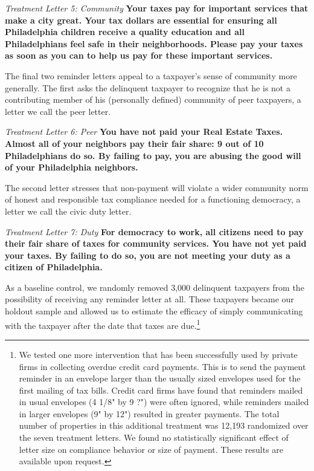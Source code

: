 \documentclass[12pt]{article}
\begin{document}
{\it Treatment Letter 5: Community} {\bf Your taxes pay for important services that make a city
  great. Your tax dollars are essential for ensuring all Philadelphia
  children receive a quality education and all Philadelphians feel
  safe in their neighborhoods. Please pay your taxes as soon as you
  can to help us pay for these important services.}

The final two reminder letters appeal to a taxpayer's sense of
community more generally.  The first asks the delinquent taxpayer to
recognize that he is not a contributing member of his (personally
defined) community of peer taxpayers, a letter we call the peer
letter.  

{\it Treatment Letter 6: Peer } {\bf  You have not paid your Real Estate Taxes. Almost all of
  your neighbors pay their fair share: 9 out of 10 Philadelphians do
  so. By failing to pay, you are abusing the good will of your
  Philadelphia neighbors.}

The second letter stresses that non-payment will violate a wider
community norm of honest and responsible tax compliance needed for a
functioning democracy, a letter we call the civic duty letter. 

{\it Treatment Letter 7: Duty } {\bf For democracy to work, all citizens need to pay their fair
  share of taxes for community services. You have not yet paid your
  taxes. By failing to do so, you are not meeting your duty as a
  citizen of Philadelphia.}


As a baseline control, we randomly removed 3,000 delinquent taxpayers
from the possibility of receiving any reminder letter at all.  These
taxpayers became our holdout sample and allowed us to estimate the
efficacy of simply communicating with the taxpayer after the date that
taxes are due.\footnote{We tested one more intervention that has been
  successfully used by private firms in collecting overdue credit card
  payments.  This is to send the payment reminder in an envelope
  larger than the usually sized envelopes used for the first mailing
  of tax bills.  Credit card firms have found that reminders mailed in
  usual envelopes (4 1/8" by 9 ?") were often ignored, while reminders
  mailed in larger envelopes (9" by 12") resulted in greater payments.
  The total number of properties in this additional treatment was
  12,193 randomized over the seven treatment letters.  We found no
  statistically significant effect of letter size on compliance
  behavior or size of payment.  These results are available upon
  request.}
	
\end{document}
